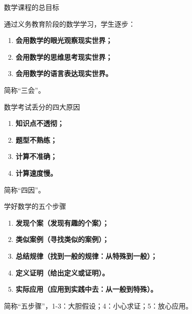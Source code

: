 \documentclass[aspectratio=169]{ctexbeamer} %
\date{\today}
\begin{document}
\begin{frame}[t]{数学课程的总目标}
\begin{spacing}{1.5} %
{\large
通过义务教育阶段的数学学习，学生逐步：
\begin{enumerate}[label={\arabic*.}]
\item \textbf{会用数学的眼光观察现实世界；}
\item \textbf{会用数学的思维思考现实世界；}
\item \textbf{会用数学的语言表达现实世界。}
\end{enumerate} 
\vspace{1cm}
\alert{简称“三会”。}
}
\end{spacing}
\end{frame}

\begin{frame}[t]{数学考试丢分的四大原因}
\begin{spacing}{1.5} %
{\large
\begin{enumerate}[label={\arabic*.}]
\item \textbf{知识点不透彻；}
\item \textbf{题型不熟练；}
\item \textbf{计算不准确；}
\item \textbf{计算速度慢。} 
\end{enumerate}
\vspace{1cm}
\alert{简称“四因”。}
}
\end{spacing}
\end{frame}

\begin{frame}[t]{学好数学的五个步骤}
\begin{spacing}{1.5} %
{\large
\begin{enumerate}[label={\arabic*.}]
\item \textbf{发现个案（发现有趣的个案）；}
\item \textbf{类似案例（寻找类似的案例）；}
\item \textbf{总结规律（找到一般的规律：从特殊到一般）；}
\item \textbf{定义证明（给出定义或证明）。} 
\item \textbf{实际应用（应用到实践中去：从一般到特殊）。} 
\end{enumerate}
\vspace{1cm}
\alert{简称“五步骤”，1-3：大胆假设；4：小心求证；5：放心应用。}
}
\end{spacing}
\end{frame}
\end{document}
